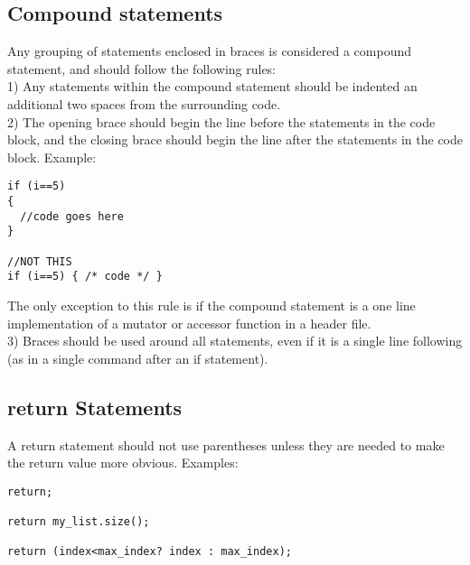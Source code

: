\documentclass[letterpaper,10pt]{article}
\begin{document}
\subsection{Compound statements}
Any grouping of statements enclosed in braces is considered a compound statement, and should follow the following rules:\\
1) Any statements within the compound statement should be indented an additional two spaces from the surrounding code.\\
2) The opening brace should begin the line before the statements in the code block, and the closing brace should begin the line after the statements in the code block.  Example: \\
\begin{verbatim}
if (i==5)
{
  //code goes here
}

//NOT THIS
if (i==5) { /* code */ }
\end{verbatim}
The only exception to this rule is if the compound statement is a one line implementation of a mutator or accessor function in a header file.\\
3) Braces should be used around all statements, even if it is a single line following (as in a single command after an if statement).
\subsection{return Statements}
A return statement should not use parentheses unless they are needed to make the return value more obvious.  Examples:
\begin{verbatim}
return;

return my_list.size();

return (index<max_index? index : max_index);
\end{verbatim}
\end{document}
